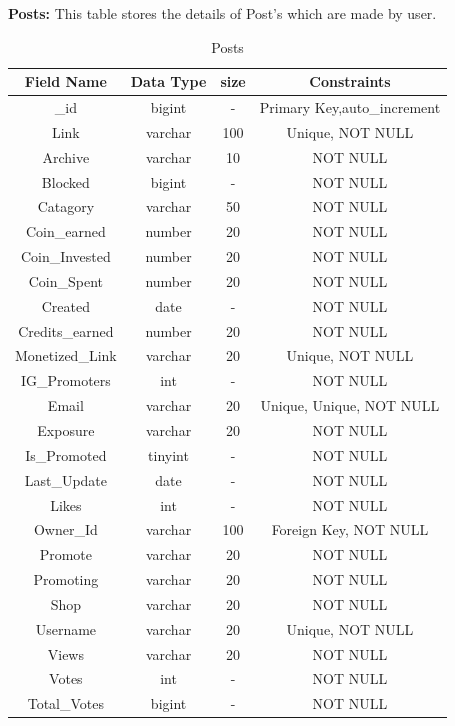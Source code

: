 \pagebreak


\textbf{Posts: } This table stores the details of Post's which are made by user.\nolinebreak
\begin{table}[hp]
\centering
\begin{tabular}{|c|c|c|c|}
\hline
\textbf{Field Name}  & \textbf{Data Type}  & \textbf{size} &\textbf{Constraints}  \\
\hline
\_id &	bigint &	 - & Primary Key,auto\_increment \\\hline
Link &	 varchar &	100 & Unique, NOT NULL \\\hline
Archive	 & varchar &	10 & NOT NULL \\\hline
Blocked &	bigint &	 - & NOT NULL \\\hline
Catagory &	varchar & 50 & NOT NULL \\\hline
Coin\_earned &	number &	 20 & NOT NULL \\\hline
Coin\_Invested &	number &	 20 & NOT NULL \\\hline
Coin\_Spent &	number &	 20 & NOT NULL \\\hline
Created &	date &	- & NOT NULL \\\hline
Credits\_earned &	number &	20 & NOT NULL \\\hline
Monetized\_Link &	varchar & 20 & Unique, NOT NULL \\\hline
IG\_Promoters &	int & - & NOT NULL \\\hline
Email &	varchar &	20 & Unique, Unique, NOT NULL \\\hline
Exposure &	varchar &	20 & NOT NULL \\\hline
Is\_Promoted &	tinyint & - & NOT NULL \\\hline
Last\_Update &	date & - & NOT NULL \\\hline
Likes &	int & - & NOT NULL \\\hline
Owner\_Id &	varchar & 100 & Foreign Key, NOT NULL \\\hline
Promote &	varchar & 20 & NOT NULL \\\hline
Promoting &	varchar & 20 & NOT NULL \\\hline
Shop &	varchar &	20 & NOT NULL \\\hline
Username &	varchar & 20 & Unique, NOT NULL \\\hline
Views &	varchar &	20 & NOT NULL \\\hline
Votes &	int & - & NOT NULL \\\hline
Total\_Votes &	bigint &	 - & NOT NULL \\\hline
\end{tabular}
\caption{Posts}
\end{table}\\


